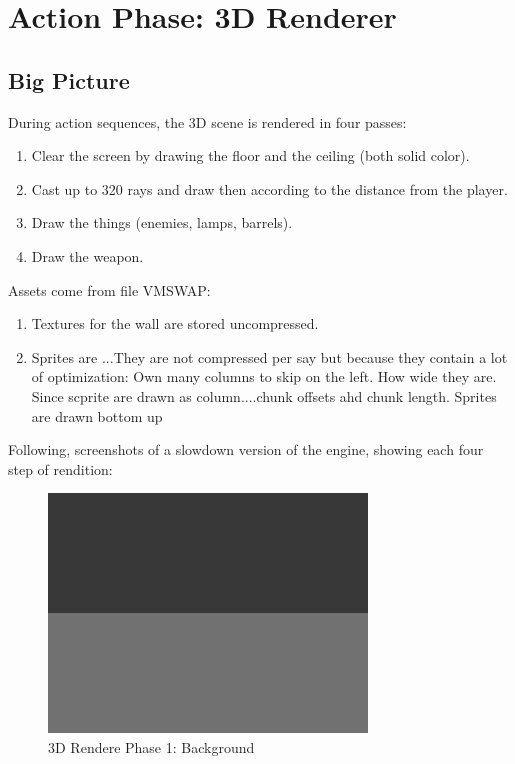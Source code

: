 \section{Action Phase: 3D Renderer}


\subsection{Big Picture}

During action sequences, the 3D scene is rendered in four passes:
\begin{enumerate}
 \item Clear the screen by drawing the floor and the ceiling (both solid color).
 \item Cast up to 320 rays and draw then according to the distance from the player.
 \item Draw the things (enemies, lamps, barrels).
 \item Draw the weapon.	
\end{enumerate}

Assets come from file VMSWAP:
\begin{enumerate}
	\item Textures for the wall are stored uncompressed.
	\item Sprites are ...They are not compressed per say but because they contain a lot of optimization: Own many columns to skip on the left. How wide they are. Since scprite are drawn as column....chunk offsets ahd chunk length. Sprites are drawn bottom up
\end{enumerate}
Following, screenshots of a slowdown version of the engine, showing each four step of rendition:
\begin{figure}[H]
\centering
 \includegraphics[width=\textwidth]{screenshots/wolf3d_1_background.png}
 \caption{3D Rendere Phase 1: Background}
 \end{figure}

